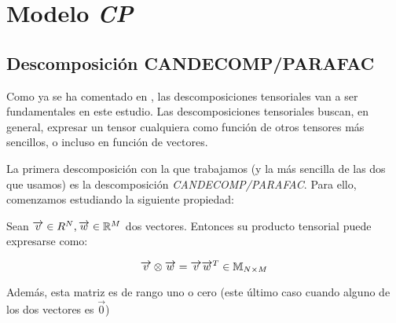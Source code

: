 \section{Modelo \textit{CP}}

\subsection{Descomposición CANDECOMP/PARAFAC}

Como ya se ha comentado en , las descomposiciones tensoriales van a ser fundamentales en este estudio. Las descomposiciones tensoriales buscan, en general, expresar un tensor cualquiera como función de otros tensores más sencillos, o incluso en función de vectores.

La primera descomposición con la que trabajamos (y la más sencilla de las dos que usamos) es la descomposición \textit{CANDECOMP/PARAFAC}. Para ello, comenzamos estudiando la siguiente propiedad:

\begin{proposicion}
    Sean $\overrightarrow{v} \in R^{N}, \overrightarrow{w} \in \mathbb{R}^{M}$ dos vectores. Entonces su producto tensorial puede expresarse como:

    $$\overrightarrow{v} \otimes \overrightarrow{w} = \overrightarrow{v} \overrightarrow{w}^T \in \mathbb{M}_{N \times M}$$

    Además, esta matriz es de rango uno o cero (este último caso cuando alguno de los dos vectores es $\vec{0}$)
\end{proposicion}

